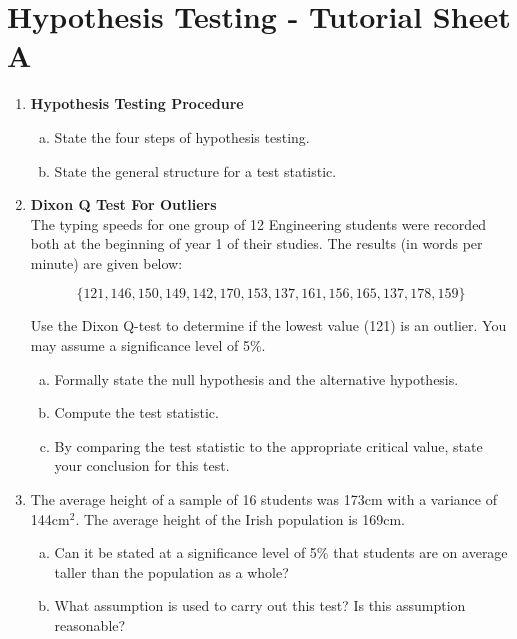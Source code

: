 \documentclass[]{article}
\begin{document}
\section*{Hypothesis Testing - Tutorial Sheet A}

\begin{enumerate}
    \item \textbf{Hypothesis Testing Procedure}
\begin{enumerate}[(a)]    
\item State the four steps of hypothesis testing.

\item State the general structure for a test statistic.
\end{enumerate}

\item \textbf{Dixon Q Test For Outliers}
\\ 
The typing speeds for one group of 12 Engineering students were recorded both at the beginning 
of year 1 of their studies. 
The results (in words per minute) are given below: 

\[\{121, 146, 150, 149, 142, 170, 153, 137, 161, 156, 165,  137, 178, 159\} \]

Use the Dixon Q-test to determine if the lowest value (121) is an outlier. 
You may assume a significance level of 5\%. 
\begin{enumerate}[(a)]
\item Formally state the null hypothesis and the alternative hypothesis. \item Compute the test statistic. 
\item By comparing the test statistic to the appropriate critical value, state your conclusion for this test. 

\end{enumerate}



\item The average height of a sample of 16 students was 173cm with a variance of 144cm$^2$. 
The average height of the Irish population is 169cm. 
\begin{enumerate}[(a)]
\item Can it be stated at a significance level of 5\% that students are on average taller than the population as a whole? 
 \item What assumption is used to carry out this test? Is this assumption reasonable?
\end{enumerate}


\end{enumerate}
\end{document}
